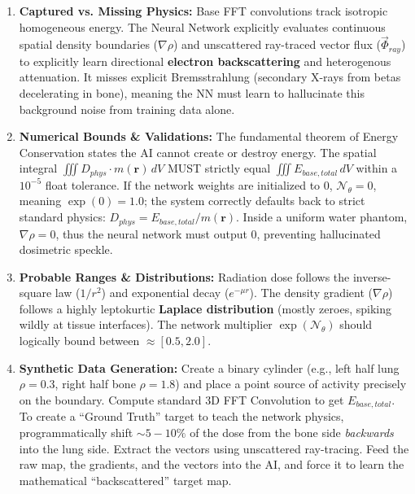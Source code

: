 \documentclass[11pt,a4paper]{article}
\begin{document}
\begin{enumerate}
    \item \textbf{Captured vs. Missing Physics:} Base FFT convolutions track isotropic homogeneous energy. The Neural Network explicitly evaluates continuous spatial density boundaries ($\nabla\rho$) and unscattered ray-traced vector flux ($\vec{\Phi}_{ray}$) to explicitly learn directional \textbf{electron backscattering} and heterogenous attenuation. It misses explicit Bremsstrahlung (secondary X-rays from betas decelerating in bone), meaning the NN must learn to hallucinate this background noise from training data alone.
    \item \textbf{Numerical Bounds \& Validations:} The fundamental theorem of Energy Conservation states the AI cannot create or destroy energy. The spatial integral $\iiint D_{phys} \cdot m(\mathbf{r}) \, dV$ MUST strictly equal $\iiint E_{base,total} \, dV$ within a $10^{-5}$ float tolerance. If the network weights are initialized to 0, $\mathcal{N}_\theta = 0$, meaning $\exp(0) = 1.0$; the system correctly defaults back to strict standard physics: $D_{phys} = E_{base,total}/m(\mathbf{r})$. Inside a uniform water phantom, $\nabla\rho = 0$, thus the neural network must output $0$, preventing hallucinated dosimetric speckle.
    \item \textbf{Probable Ranges \& Distributions:} Radiation dose follows the inverse-square law ($1/r^2$) and exponential decay ($e^{-\mu r}$). The density gradient ($\nabla\rho$) follows a highly leptokurtic \textbf{Laplace distribution} (mostly zeroes, spiking wildly at tissue interfaces). The network multiplier $\exp(\mathcal{N}_\theta)$ should logically bound between $\approx [0.5, 2.0]$.
    \item \textbf{Synthetic Data Generation:} Create a binary cylinder (e.g., left half lung $\rho=0.3$, right half bone $\rho=1.8$) and place a point source of activity precisely on the boundary. Compute standard 3D FFT Convolution to get $E_{base,total}$. To create a ``Ground Truth'' target to teach the network physics, programmatically shift $\sim 5-10\%$ of the dose from the bone side \textit{backwards} into the lung side. Extract the vectors using unscattered ray-tracing. Feed the raw map, the gradients, and the vectors into the AI, and force it to learn the mathematical ``backscattered'' target map.
\end{enumerate}
\end{document}

